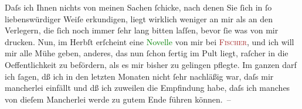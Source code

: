 \pstart
           Daſs ich Ihnen nichts von meinen Sachen ſchicke, nach denen Sie ſich in ſo
               liebenswürdiger Weiſe erkundigen, liegt wirklich weniger an mir als an den Verlegern,
               die ſich noch {\pb}immer ſehr lang bitten laſſen, bevor ſie was
               von mir drucken. Nun, im Herbſt erſcheint eine \textcolor{green}{Novelle}\ledrightnote{{$\rightarrow$}\emph{\textcolor{green}{Sterben. Novelle}}} von mir bei \textsc{\textcolor{brown}{Fischer}\ledrightnote{\textcolor{brown}{S. Fischer Verlag}}}, und ich will mir alle Mühe geben, anderes, das nun ſchon fertig im Pult liegt,
               raſcher in die Oeffentlichkeit zu befördern, als es mir bisher zu gelingen pflegte.
               Im ganzen darf ich ſagen, dß ich in den letzten Monaten nicht {\pb}ſehr nachläßig war, daſs mir mancherlei einfällt und dß ich
               zuweilen die Empfindung habe, daſs ich manches von dieſem Mancherlei werde zu gutem
               Ende führen können. –\pend
           
